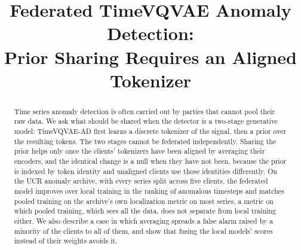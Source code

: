 \documentclass[conference]{IEEEtran}
\begin{document}
\title{Federated TimeVQVAE Anomaly Detection:\\
Prior Sharing Requires an Aligned Tokenizer}

\author{
}

\maketitle

\begin{abstract}
Time series anomaly detection is often carried out by parties that cannot pool their raw data. We
ask what should be shared when the detector is a two-stage generative model: TimeVQVAE-AD first
learns a discrete tokenizer of the signal, then a prior over the resulting tokens. The two stages cannot be federated independently. Sharing the prior
helps only once the clients' tokenizers have been aligned by averaging their encoders, and the
identical change is a null when they have not been, because the prior is indexed by token identity
and unaligned clients use those identities differently. On the UCR anomaly archive, with every
series split across five clients, the federated model improves over local training in the ranking of
anomalous timesteps and matches pooled training on the archive's own localization metric on most
series, a metric on which pooled training, which sees all the data, does not separate from local
training either. We also describe a case in which averaging spreads a false alarm raised by a
minority of the clients to all of them, and show that fusing the local models' scores instead of
their weights avoids it.
\end{abstract}
\end{document}
